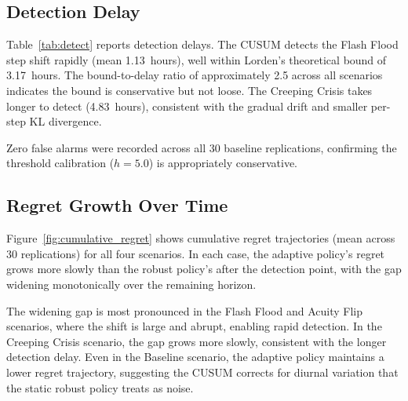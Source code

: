 \documentclass[11pt,twocolumn]{article}
\theoremstyle{plain}
\theoremstyle{definition}
\begin{document}
\subsection{Detection Delay}

\begin{table}[!htbp]
\centering
\caption{Detection delay (mean hours). Lorden's bound is $1 + h / D_{\text{KL}}$ with $h = 5.0$.}
\label{tab:detect}
\small
{}
\end{table}

Table~\ref{tab:detect} reports detection delays. The CUSUM detects the Flash Flood step shift rapidly (mean 1.13~hours), well within Lorden's theoretical bound of 3.17~hours. The bound-to-delay ratio of approximately 2.5 across all scenarios indicates the bound is conservative but not loose. The Creeping Crisis takes longer to detect (4.83~hours), consistent with the gradual drift and smaller per-step KL divergence.

Zero false alarms were recorded across all 30 baseline replications, confirming the threshold calibration ($h = 5.0$) is appropriately conservative.

\subsection{Regret Growth Over Time}

Figure~\ref{fig:cumulative_regret} shows cumulative regret trajectories (mean across 30 replications) for all four scenarios. In each case, the adaptive policy's regret grows more slowly than the robust policy's after the detection point, with the gap widening monotonically over the remaining horizon.

The widening gap is most pronounced in the Flash Flood and Acuity Flip scenarios, where the shift is large and abrupt, enabling rapid detection. In the Creeping Crisis scenario, the gap grows more slowly, consistent with the longer detection delay. Even in the Baseline scenario, the adaptive policy maintains a lower regret trajectory, suggesting the CUSUM corrects for diurnal variation that the static robust policy treats as noise.
\end{document}
